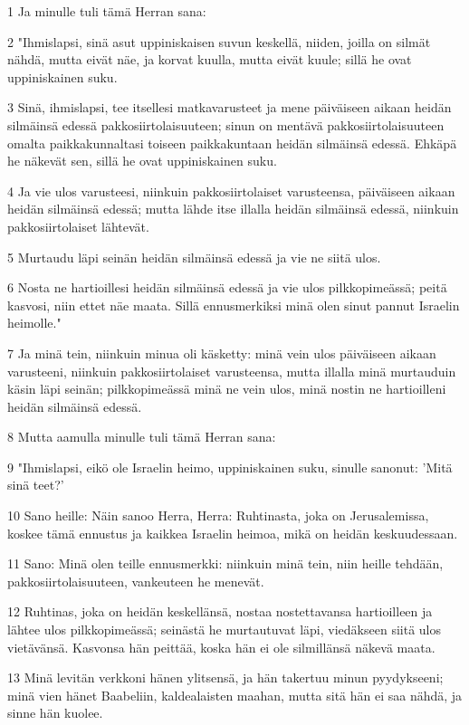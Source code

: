 \par 1 Ja minulle tuli tämä Herran sana:
\par 2 "Ihmislapsi, sinä asut uppiniskaisen suvun keskellä, niiden, joilla on silmät nähdä, mutta eivät näe, ja korvat kuulla, mutta eivät kuule; sillä he ovat uppiniskainen suku.
\par 3 Sinä, ihmislapsi, tee itsellesi matkavarusteet ja mene päiväiseen aikaan heidän silmäinsä edessä pakkosiirtolaisuuteen; sinun on mentävä pakkosiirtolaisuuteen omalta paikkakunnaltasi toiseen paikkakuntaan heidän silmäinsä edessä. Ehkäpä he näkevät sen, sillä he ovat uppiniskainen suku.
\par 4 Ja vie ulos varusteesi, niinkuin pakkosiirtolaiset varusteensa, päiväiseen aikaan heidän silmäinsä edessä; mutta lähde itse illalla heidän silmäinsä edessä, niinkuin pakkosiirtolaiset lähtevät.
\par 5 Murtaudu läpi seinän heidän silmäinsä edessä ja vie ne siitä ulos.
\par 6 Nosta ne hartioillesi heidän silmäinsä edessä ja vie ulos pilkkopimeässä; peitä kasvosi, niin ettet näe maata. Sillä ennusmerkiksi minä olen sinut pannut Israelin heimolle."
\par 7 Ja minä tein, niinkuin minua oli käsketty: minä vein ulos päiväiseen aikaan varusteeni, niinkuin pakkosiirtolaiset varusteensa, mutta illalla minä murtauduin käsin läpi seinän; pilkkopimeässä minä ne vein ulos, minä nostin ne hartioilleni heidän silmäinsä edessä.
\par 8 Mutta aamulla minulle tuli tämä Herran sana:
\par 9 "Ihmislapsi, eikö ole Israelin heimo, uppiniskainen suku, sinulle sanonut: 'Mitä sinä teet?'
\par 10 Sano heille: Näin sanoo Herra, Herra: Ruhtinasta, joka on Jerusalemissa, koskee tämä ennustus ja kaikkea Israelin heimoa, mikä on heidän keskuudessaan.
\par 11 Sano: Minä olen teille ennusmerkki: niinkuin minä tein, niin heille tehdään, pakkosiirtolaisuuteen, vankeuteen he menevät.
\par 12 Ruhtinas, joka on heidän keskellänsä, nostaa nostettavansa hartioilleen ja lähtee ulos pilkkopimeässä; seinästä he murtautuvat läpi, viedäkseen siitä ulos vietävänsä. Kasvonsa hän peittää, koska hän ei ole silmillänsä näkevä maata.
\par 13 Minä levitän verkkoni hänen ylitsensä, ja hän takertuu minun pyydykseeni; minä vien hänet Baabeliin, kaldealaisten maahan, mutta sitä hän ei saa nähdä, ja sinne hän kuolee.

